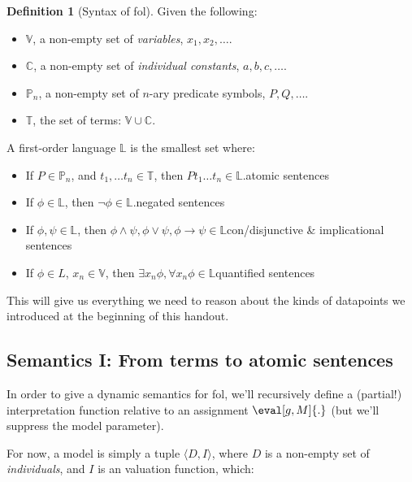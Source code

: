 \documentclass[nols,twoside,nofonts,nobib,nohyper]{tufte-handout}
\providecommand{\tightlist}{%
  \setlength{\itemsep}{0pt}\setlength{\parskip}{0pt}}
\theoremstyle{definition}
\newtheorem{definition}{Definition}[section]
\begin{document}
\begin{fullwidth}
\begin{definition}[Syntax of \ac{fol}] Given the following:

  \tightlist
  \begin{itemize}
          \tightlist
          \item $\mathbb{V}$, a non-empty set of \textit{variables}, $x_{1},x_{2},…$.
          \item $\mathbb{C}$, a non-empty set of \textit{individual constants}, $a,b,c,…$.
          \item $\mathbb{P}_{n}$, a non-empty set of $n$-ary predicate symbols, $P,Q,…$.
          \item $\mathbb{T}$, the set of terms: $\mathbb{V} ∪ \mathbb{C}$.
  \end{itemize}

  A first-order language $\mathbb{L}$ is the smallest set where:

  \begin{itemize}
          \tightlist
          \item If $P ∈ \mathbb{P}_{n}$, and $t_1,…t_{n} ∈ \mathbb{T}$, then $P t_{1} … t_{n} ∈ \mathbb{L}$.\hfill atomic sentences
          \item If $ϕ ∈ \mathbb{L}$, then $¬ ϕ ∈ \mathbb{L}$.\hfill negated sentences
          \item If $ϕ,ψ ∈ \mathbb{L}$, then $ϕ ∧ ψ, ϕ ∨ ψ, ϕ → ψ ∈ \mathbb{L}$\hfill con/disjunctive \& implicational sentences
          \item If $ϕ ∈ L$, $x_{n} ∈ \mathbb{V}$, then $∃x_{n} ϕ, ∀x_{n} ϕ ∈ \mathbb{L}$\hfill quantified sentences
  \end{itemize}
\end{definition}
\end{fullwidth}

This will give us everything we need to reason about the kinds of datapoints we introduced at the beginning of this handout.

\subsection{Semantics I: From terms to atomic sentences}

In order to give a dynamic semantics for \ac{fol}, we'll recursively define a (partial!) interpretation function relative to an assignment $\eval[g,M]{.}$ (but we'll suppress the model parameter).

For now, a model is simply a tuple $⟨D,I⟩$, where $D$ is a non-empty set of \textit{individuals}, and $I$ is an valuation function, which:
\end{document}
